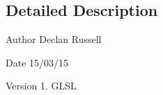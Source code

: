 \subsection{Detailed Description}
\begin{DoxyAuthor}{Author}
Declan Russell 
\end{DoxyAuthor}
\begin{DoxyDate}{Date}
15/03/15 
\end{DoxyDate}
\begin{DoxyVersion}{Version}
1.  G\-L\-S\-L 
\end{DoxyVersion}
